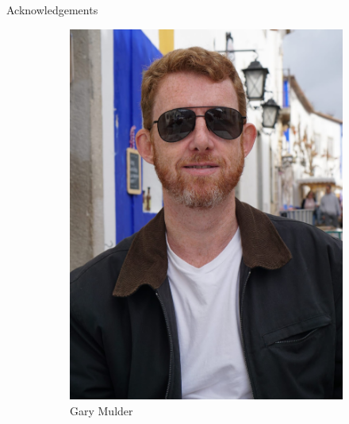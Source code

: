 \begin{frame}{Acknowledgements}
\begin{figure}
\begin{subfigure}[b]{0.3\textwidth}
        \includegraphics[width=\textwidth]{figures/gary-mulder.jpeg}
        \caption{Gary Mulder}
    \end{subfigure}
    \hfill
    \begin{subfigure}[b]{0.3\textwidth}
        \centering

\end{subfigure}
\end{figure}
\end{frame}
